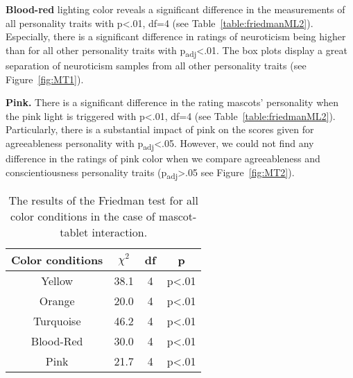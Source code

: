 \par\textbf{Blood-red}
lighting color reveals a significant difference in the measurements of all personality traits
with p<.01, df=4 (see Table~\ref{table:friedmanML2}).
Especially, there is a significant difference in ratings of neuroticism
being higher than for all other personality traits with p\textsubscript{adj}<.01.
The box plots display a great separation of neuroticism samples from all
other personality traits (see Figure~\ref{fig:MT1}).


\par\textbf{Pink.}
There is a significant difference in the rating mascots' personality when the pink light is
triggered with p<.01, df=4 (see Table~\ref{table:friedmanML2}).
Particularly, there is a substantial impact of pink on the scores given
for agreeableness personality with p\textsubscript{adj}<.05.
However, we could not find any difference in the ratings of pink color when
we compare agreeableness and conscientiousness personality traits
(p\textsubscript{adj}>.05 see Figure~\ref{fig:MT2}).


\begin{table}[hbt!]
    \renewcommand{\arraystretch}{1}
    \begin{center}
        \begin{tabular}{|c|c|c|c|}
            \hline
            \textbf{Color conditions} & \textbf{$\chi^2$} & \textbf{df} & \textbf{p} \\
            \hline
            Yellow &38.1 &4 &p<.01 \\
            \hline
            Orange &20.0 &4 &p<.01 \\
            \hline
            Turquoise &46.2 &4 &p<.01 \\
            \hline
            Blood-Red &30.0 &4 &p<.01 \\
            \hline
            Pink &21.7 &4 &p<.01 \\
            \hline
        \end{tabular}
        \caption{The results of the Friedman test for all color conditions in the case of mascot-tablet interaction.}
        \label{table:friedmanMT2}
    \end{center}
\end{table}

